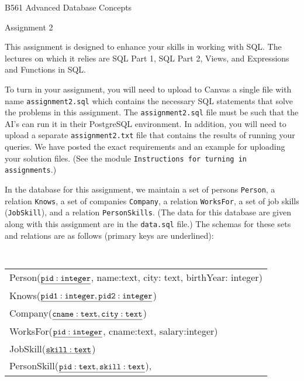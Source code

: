 


\centerline{\Large B561 Advanced Database Concepts}
\centerline{\Large Assignment 2}
\medskip

This assignment is designed to enhance your skills in working with SQL.   The lectures on which it relies are SQL Part 1, SQL Part 2, 
Views, and Expressions and Functions in SQL.

To turn in your assignment, you will need to upload to Canvas a single file with name {\tt assignment2.sql} which contains 
the necessary SQL statements that solve the problems in this assignment.   
The {\tt assignment2.sql} file must be such that the AI's can run it in their PostgreSQL environment.  
In addition, you will need to upload a separate {\tt assignment2.txt} file that contains the results of running
your queries.
We have posted the exact requirements and an example for uploading your solution files.  (See the module
{\tt Instructions for turning in assignments}.)


In the database for this assignment, 
we maintain a set of persons {\tt Person}, a relation {\tt Knows}, a set of companies {\tt Company}, a relation {\tt WorksFor}, 
a set of job skills ({\tt JobSkill}), and a relation {\tt PersonSkills}.   
(The data for this database are given along with this assignment are
in the {\tt data.sql} file.)
The schemas for these sets and relations are as follows (primary keys are underlined):

{\small
\begin{center}
{\tt
  \begin{tabular}{l}
  {Person}($\underline{\tt pid: integer}$, name:text, city: text, birthYear: integer)\\
  {Knows}($\underline{\tt pid1:integer, pid2:integer}$) \\
  {Company}($\underline{\tt cname:text,  city:text}$) \\
  {WorksFor}($\underline{\tt pid: integer}$, cname:text, salary:integer) \\
   {JobSkill}($\underline{\tt skill:text }$) \\
  {PersonSkill}($\underline{\tt pid: text, skill:text}$),\\
  \end{tabular}
  }
\end{center}
}

